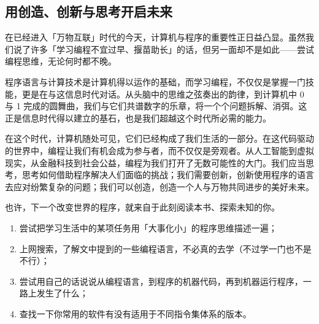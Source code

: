 \subsection{用创造、创新与思考开启未来}

在已经进入「万物互联」时代的今天，计算机与程序的重要性正日益凸显。虽然我们说了许多「学习编程不宜过早、揠苗助长」的话，但另一面却不是如此——尝试编程思维，无论何时都不晚。

程序语言与计算技术是计算机得以运作的基础，而学习编程，不仅仅是掌握一门技能，更是在与这信息时代对话。从头脑中的思维之弦奏出的韵律，到计算机中 0 与 1 完成的圆舞曲，我们与它们共谱数字的乐章，将一个个问题拆解、消弭。这正是信息时代得以建立的基石，也是我们超越这个时代所必需的能力。

在这个时代，计算机随处可见，它们已经构成了我们生活的一部分。在这代码驱动的世界中，编程让我们有机会成为参与者，而不仅仅是旁观者。从人工智能到虚拟现实，从金融科技到社会公益，编程为我们打开了无数可能性的大门。我们应当思考，思考如何借助程序解决人们面临的挑战；我们需要创新，创新使用程序的语言去应对纷繁复杂的问题；我们可以创造，创造一个人与万物共同进步的美好未来。

也许，下一个改变世界的程序，就来自于此刻阅读本书、探索未知的你。

\practice

\begin{enumerate}
  \item 尝试把学习生活中的某项任务用「大事化小」的程序思维描述一遍；
  \item 上网搜索，了解文中提到的一些编程语言，不必真的去学（不过学一门也不是不行）；
  \item 尝试用自己的话说说从编程语言，到程序的机器代码，再到机器运行程序，一路上发生了什么；
  \item 查找一下你常用的软件有没有适用于不同指令集体系的版本。
\end{enumerate}